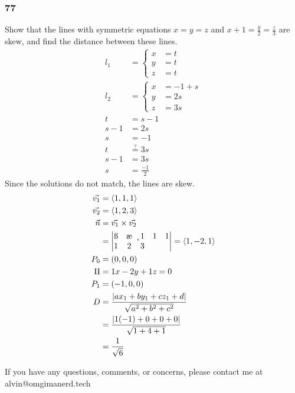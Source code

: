 \documentclass{math}
\begin{document}
\subsubsection*{77}
Show that the lines with symmetric equations \( x = y = z \) and
\( x+1 = \frac{y}{2} = \frac{z}{3} \) are skew, and find the distance
between these lines.
\begin{align*}
  l_1 &= \begin{cases}
    x &= t \\
    y &= t \\
    z &= t
  \end{cases} \\
  l_2 &= \begin{cases}
    x &= -1+s \\
    y &= 2s \\
    z &= 3s
  \end{cases} \\
  t &= s-1 \\
  s-1 &= 2s \\
  s &= -1 \\
  t &\stackrel{?}{=} 3s \\
  s-1 &= 3s \\
  s &= \frac{-1}{2}
\end{align*}
Since the solutions do not match, the lines are skew.
\begin{align*}
  \vec{v_1} &= \langle1,1,1\rangle \\
  \vec{v_2} &= \langle1,2,3\rangle \\
  \vec{n} &= \vec{v_1}\times\vec{v_2} \\
  &= \begin{vmatrix}
    \i & \j & \k \\
    1 & 1 & 1 \\
    1 & 2 & 3
  \end{vmatrix} = \langle1,-2,1\rangle \\
  P_0 &= (0,0,0) \\
  \Pi &= 1x-2y+1z = 0 \\
  P_1 &= (-1,0,0) \\
  D &= \frac{|ax_1+by_1+cz_1+d|}{\sqrt{a^2+b^2+c^2}} \\
  &= \frac{|1(-1)+0+0+0|}{\sqrt{1+4+1}} \\
  &= \frac{1}{\sqrt{6}}
\end{align*}

\begin{center}
  If you have any questions, comments, or concerns, please contact me at
  alvin@omgimanerd.tech
\end{center}
\end{document}
